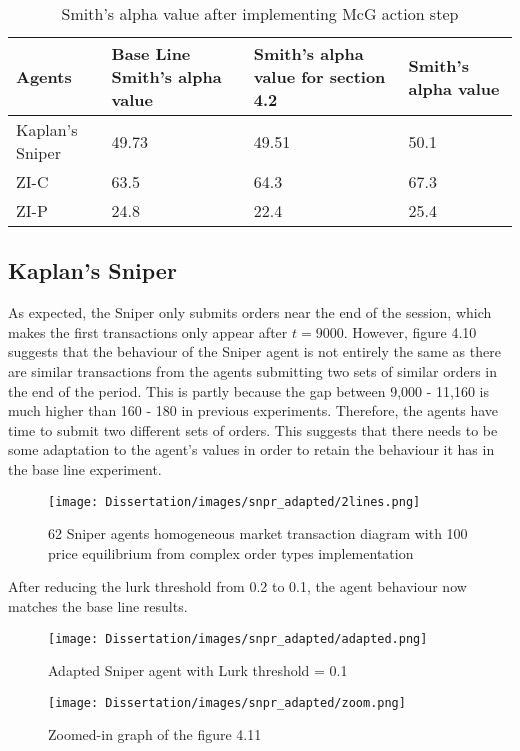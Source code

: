 \begin{table}[h]
\centering
\begin{tabular}{ |m||p{4cm}|p{4cm}|p{4cm}|} 
\hline
\textbf{Agents}& \textbf{Base Line Smith's alpha value} & \textbf{Smith's alpha value for section 4.2} & \textbf{Smith's alpha value} \\
\hline
\hline
Kaplan's Sniper & 49.73  & 49.51 & 50.1 \\ 
\hline
ZI-C & 63.5 & 64.3 & 67.3\\ 
\hline
ZI-P & 24.8 & 22.4 & 25.4 \\ 
\hline
\end{tabular}
\caption{Smith's alpha value after implementing McG action step}  
\end{table}
\FloatBarrier

\subsection{Kaplan's Sniper}
As expected, the Sniper only submits orders near the end of the session, which makes the first transactions only appear after $t = 9000$. However, figure 4.10 suggests that the behaviour of the Sniper agent is not entirely the same as there are similar transactions from the agents submitting two sets of similar orders in the end of the period. This is partly because the gap between 9,000 - 11,160 is much higher than 160 - 180 in previous experiments. Therefore, the agents have time to submit two different sets of orders. This suggests that there needs to be some adaptation to the agent's values in order to retain the behaviour it has in the base line experiment. 

\begin{figure}[h]
\texttt{[image: Dissertation/images/snpr\_adapted/2lines.png]}
\caption{62 Sniper agents homogeneous market transaction diagram with 100 price equilibrium from complex order types implementation} 
\end{figure} 
\FloatBarrier

After reducing the lurk threshold from 0.2 to 0.1, the agent behaviour now matches the base line results. 

\begin{figure}[h]
\texttt{[image: Dissertation/images/snpr\_adapted/adapted.png]}
\caption{Adapted Sniper agent with Lurk threshold = 0.1} 
\end{figure} 
\FloatBarrier

\begin{figure}[h]
\texttt{[image: Dissertation/images/snpr\_adapted/zoom.png]}
\caption{Zoomed-in graph of the figure 4.11} 
\end{figure} 
\FloatBarrier

